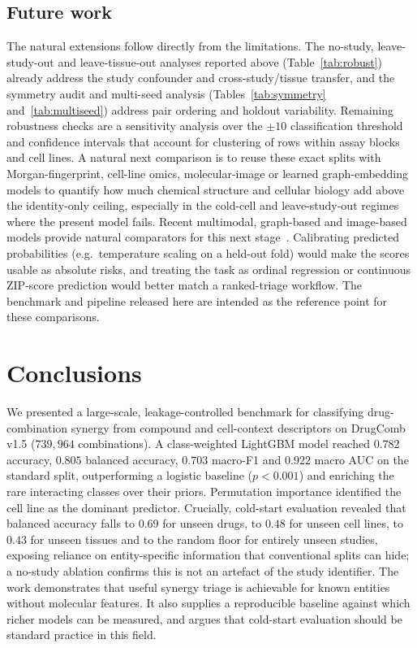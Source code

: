 \documentclass[11pt]{article}
\begin{document}
\subsection{Future work}
The natural extensions follow directly from the limitations. The no-study, leave-study-out and
leave-tissue-out analyses reported above (Table~\ref{tab:robust}) already address the study confounder
and cross-study/tissue transfer, and the symmetry audit and multi-seed analysis
(Tables~\ref{tab:symmetry} and~\ref{tab:multiseed}) address pair ordering and holdout variability.
Remaining robustness checks are a sensitivity analysis over the $\pm 10$ classification threshold and
confidence intervals that account for clustering of rows within assay blocks and cell lines.
A natural next comparison is to reuse these exact splits with Morgan-fingerprint,
cell-line omics, molecular-image or learned graph-embedding models to quantify how much chemical
structure and cellular biology add above the identity-only ceiling, especially in the cold-cell and
leave-study-out regimes where the present model fails. Recent
multimodal, graph-based and image-based models provide natural comparators for this next
stage~\cite{monem2024,besharatifard2024,mehrabani2025}. Calibrating predicted probabilities (e.g.\
temperature scaling on a held-out fold) would make the scores usable as absolute risks, and treating
the task as ordinal regression or continuous ZIP-score prediction would better match a ranked-triage
workflow. The benchmark and pipeline released here are intended as the reference point for these
comparisons.

\section{Conclusions}
We presented a large-scale, leakage-controlled benchmark for classifying drug-combination synergy from
compound and cell-context descriptors on DrugComb v1.5 ($739{,}964$ combinations). A class-weighted
LightGBM model reached $0.782$ accuracy, $0.805$ balanced accuracy, $0.703$ macro-F1 and $0.922$ macro
AUC on the standard split, outperforming a logistic baseline ($p<0.001$) and enriching the rare
interacting classes over their priors. Permutation importance identified the cell line as the dominant
predictor. Crucially, cold-start evaluation revealed that balanced accuracy falls to $0.69$ for unseen
drugs, to $0.48$ for unseen cell lines, to $0.43$ for unseen tissues and to the random floor for
entirely unseen studies, exposing reliance on entity-specific information that conventional splits can
hide; a no-study ablation confirms this is not an artefact of the study identifier. The work
demonstrates that useful synergy triage is achievable for known entities without molecular features.
It also supplies a reproducible baseline against which richer models can be measured, and argues that
cold-start evaluation should be standard practice in this field.
\end{document}
